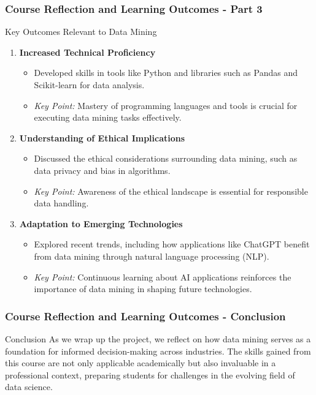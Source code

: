 \documentclass[aspectratio=169]{beamer}
\begin{document}
\begin{frame}[fragile]
    \frametitle{Course Reflection and Learning Outcomes - Part 3}
    
    \begin{block}{Key Outcomes Relevant to Data Mining}
        \begin{enumerate}
            \item \textbf{Increased Technical Proficiency}
                \begin{itemize}
                    \item Developed skills in tools like Python and libraries such as Pandas and Scikit-learn for data analysis.
                    \item \textit{Key Point:} Mastery of programming languages and tools is crucial for executing data mining tasks effectively.
                \end{itemize}
                
            \item \textbf{Understanding of Ethical Implications}
                \begin{itemize}
                    \item Discussed the ethical considerations surrounding data mining, such as data privacy and bias in algorithms.
                    \item \textit{Key Point:} Awareness of the ethical landscape is essential for responsible data handling.
                \end{itemize}
                
            \item \textbf{Adaptation to Emerging Technologies}
                \begin{itemize}
                    \item Explored recent trends, including how applications like ChatGPT benefit from data mining through natural language processing (NLP).
                    \item \textit{Key Point:} Continuous learning about AI applications reinforces the importance of data mining in shaping future technologies.
                \end{itemize}
        \end{enumerate}
    \end{block}
\end{frame}

\begin{frame}[fragile]
    \frametitle{Course Reflection and Learning Outcomes - Conclusion}
    
    \begin{block}{Conclusion}
        As we wrap up the project, we reflect on how data mining serves as a foundation for informed decision-making across industries. The skills gained from this course are not only applicable academically but also invaluable in a professional context, preparing students for challenges in the evolving field of data science.
    \end{block}
\end{frame}
\end{document}
